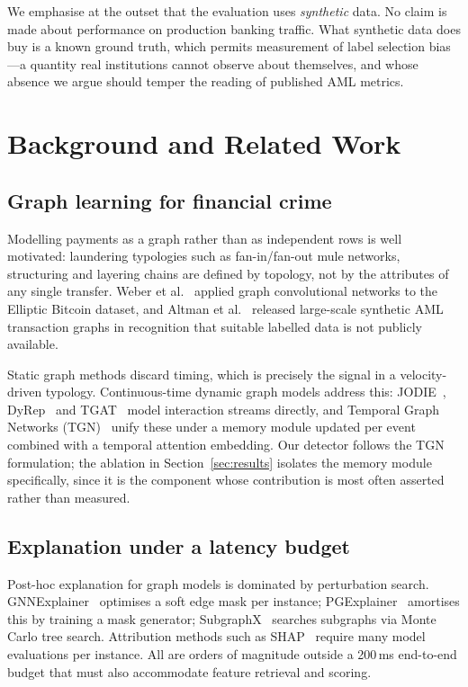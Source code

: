\documentclass[conference]{IEEEtran}
\begin{document}
We emphasise at the outset that the evaluation uses \emph{synthetic} data. No
claim is made about performance on production banking traffic. What synthetic
data does buy is a known ground truth, which permits measurement of label
selection bias---a quantity real institutions cannot observe about themselves,
and whose absence we argue should temper the reading of published AML metrics.

\section{Background and Related Work}

\subsection{Graph learning for financial crime}

Modelling payments as a graph rather than as independent rows is well
motivated: laundering typologies such as fan-in/fan-out mule networks,
structuring and layering chains are defined by topology, not by the attributes
of any single transfer. Weber et al.~\cite{weber2019elliptic} applied graph
convolutional networks to the Elliptic Bitcoin dataset, and Altman et
al.~\cite{altman2023aml} released large-scale synthetic AML transaction graphs
in recognition that suitable labelled data is not publicly available.

Static graph methods discard timing, which is precisely the signal in a
velocity-driven typology. Continuous-time dynamic graph models address this:
JODIE~\cite{kumar2019jodie}, DyRep~\cite{trivedi2019dyrep} and
TGAT~\cite{xu2020tgat} model interaction streams directly, and Temporal Graph
Networks (TGN)~\cite{rossi2020tgn} unify these under a memory module updated per
event combined with a temporal attention embedding. Our detector follows the TGN
formulation; the ablation in Section~\ref{sec:results} isolates the memory
module specifically, since it is the component whose contribution is most often
asserted rather than measured.

\subsection{Explanation under a latency budget}

Post-hoc explanation for graph models is dominated by perturbation search.
GNNExplainer~\cite{ying2019gnnexplainer} optimises a soft edge mask per
instance; PGExplainer~\cite{luo2020pgexplainer} amortises this by training a
mask generator; SubgraphX~\cite{yuan2021subgraphx} searches subgraphs via Monte
Carlo tree search. Attribution methods such as SHAP~\cite{lundberg2017shap}
require many model evaluations per instance. All are orders of magnitude outside
a 200\,ms end-to-end budget that must also accommodate feature retrieval and
scoring.
\end{document}
